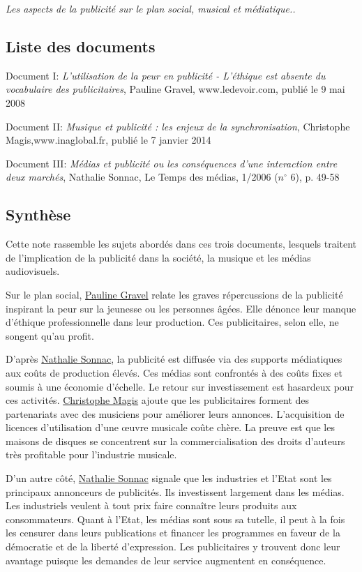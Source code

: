 \documentclass[11pt]{article}
\begin{document}
\emph{\large Les aspects de la publicité sur le plan social, musical et médiatique..}

\subsection{Liste des documents}
Document I: \textit{L'utilisation de la peur en publicité - L'éthique est absente du vocabulaire des publicitaires}, Pauline Gravel, www.ledevoir.com, publié le 9 mai 2008

Document II: \textit{Musique et publicité : les enjeux de la synchronisation}, Christophe Magis,\newline www.inaglobal.fr, publié le 7 janvier 2014

Document III: \textit{Médias et publicité ou les conséquences d’une interaction entre deux marchés}, Nathalie Sonnac, Le Temps des médias, 1/2006 ($n^{\circ}$ 6), p. 49-58 


\subsection{Synthèse}

Cette note rassemble les sujets abordés dans ces trois documents, lesquels traitent de l’implication de la publicité dans la société, la musique et les médias audiovisuels.

 Sur le plan social, \underline{Pauline Gravel} relate les graves répercussions de la publicité inspirant la peur sur la jeunesse ou les personnes âgées. Elle dénonce leur manque d’éthique professionnelle dans leur production. Ces publicitaires, selon elle, ne songent qu’au profit.

D’après \underline{Nathalie Sonnac}, la publicité est diffusée via des supports médiatiques aux coûts de production élevés. Ces médias sont confrontés à des coûts fixes et soumis à une économie d'échelle. Le retour sur investissement est hasardeux pour ces activités. \underline{Christophe Magis} ajoute que les publicitaires forment des partenariats avec des musiciens pour améliorer leurs annonces. L’acquisition de licences d’utilisation d’une \oe uvre musicale coûte chère. La preuve est que les maisons de disques se concentrent sur la commercialisation des droits d’auteurs très profitable pour l’industrie musicale.

D’un autre côté, \underline{Nathalie Sonnac} signale que les industries et l’Etat sont les principaux annonceurs de publicités. Ils investissent largement dans les médias. Les industriels veulent à tout prix faire connaître leurs produits aux consommateurs. Quant à l’Etat, les médias sont sous sa tutelle, il peut à la fois les censurer dans leurs publications et financer les programmes en faveur de la démocratie et de la liberté d’expression. Les publicitaires y trouvent donc leur avantage puisque les demandes de leur service augmentent en conséquence.
\end{document}
